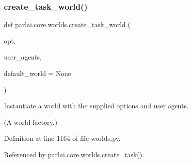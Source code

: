\mbox{\label{namespaceparlai_1_1core_1_1worlds_a055ee493c9ed03ecff4832f52b408f8c}} 
\subsubsection{\texorpdfstring{create\+\_\+task\+\_\+world()}{create\_task\_world()}}
{\footnotesize\ttfamily def parlai.\+core.\+worlds.\+create\+\_\+task\+\_\+world (\begin{DoxyParamCaption}\item[{}]{opt,  }\item[{}]{user\+\_\+agents,  }\item[{}]{default\+\_\+world = {\ttfamily None} }\end{DoxyParamCaption})}

\begin{DoxyVerb}Instantiate a world with the supplied options and user agents.

(A world factory.)
\end{DoxyVerb}
 

Definition at line 1164 of file worlds.\+py.



Referenced by parlai.\+core.\+worlds.\+create\+\_\+task().

